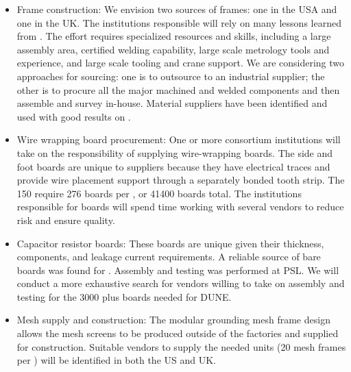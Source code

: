 \begin{itemize}

\item Frame construction: We envision two sources of frames: one in the USA and one in the UK. The institutions responsible will rely on many lessons learned from . The effort requires specialized resources and skills, including a large assembly area, certified welding capability, large scale metrology tools and experience, and large scale tooling and crane support. We are considering two approaches for sourcing: one is to outsource to an industrial supplier; the other is to procure all the major machined and welded components and then assemble and survey in-house. Material suppliers have been identified and used with good results on .

\item Wire wrapping board procurement: One or more consortium institutions will take on the responsibility of supplying wire-wrapping boards. The side and foot boards are unique to suppliers because they have electrical traces and provide wire placement support through a separately bonded tooth strip. The \num{150}  require \num{276} boards per , or \num{41400} boards total. The institutions responsible for boards will spend time working with several vendors to reduce risk and ensure quality. 

\item Capacitor resistor boards: These boards are unique given their thickness, 
 components, and leakage current requirements. A reliable source of bare boards was found for . Assembly and testing was performed at PSL. We will conduct a more exhaustive search for vendors willing to take on assembly and testing for the \num{3000} plus boards needed for DUNE.

\item Mesh supply and construction: The modular grounding mesh frame design allows the mesh screens to be produced outside of the factories and supplied for  construction.  Suitable vendors to supply the needed units (20 mesh frames per ) will be identified in both the US and UK.   %


\end{itemize}
